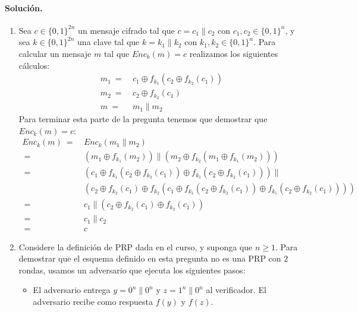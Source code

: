 \paragraph{Solución.}                                                                                                                
\begin{enumerate}                                                                                                                   
  \item Sea $c \in \{0,1\}^{2n}$ un mensaje cifrado tal que $c = c_1 \| c_2$ con $c_1,
c_2 \in \{0,1\}^n$, y sea $k \in \{0,1\}^{2n}$ una clave tal que $k =
k_1 \| k_2$ con $k_1, k_2 \in \{0,1\}^n$. Para calcular un mensaje $m$ tal que $\textit{Enc}_k(m) = c$ realizamos los siguientes cálculos:
\begin{align*}
m_1 \ = \ &c_1 \oplus f_{k_1}(c_2 \oplus f_{k_2}(c_1))\\
m_2 \ = \ &c_2 \oplus f_{k_2}(c_1)\\
m \ = \ &m_1 \| m_2
\end{align*}
Para terminar esta parte de la pregunta tenemos que demostrar que $\textit{Enc}_k(m) = c$:
\begin{align*}
\textit{Enc}_k(m) \ = \ &\textit{Enc}_k(m_1 \| m_2)\\
\ = \ &(m_1 \oplus f_{k_1}(m_2)) \| (m_2 \oplus f_{k_2}(m_1 \oplus f_{k_1}(m_2)))\\
\ = \ &(c_1 \oplus f_{k_1}(c_2 \oplus f_{k_2}(c_1)) \oplus f_{k_1}(c_2 \oplus f_{k_2}(c_1))) \|\\
&(c_2 \oplus f_{k_2}(c_1) \oplus f_{k_2}(c_1 \oplus f_{k_1}(c_2 \oplus f_{k_2}(c_1)) \oplus f_{k_1}(c_2 \oplus f_{k_2}(c_1))))\\
\ = \ & c_1 \| (c_2 \oplus f_{k_2}(c_1) \oplus f_{k_2}(c_1))\\
\ = \ & c_1 \| c_2\\
\ = \ & c
\end{align*}

\item Considere la definición de PRP dada en el curso, y suponga que $n \geq 1$. Para demostrar que el esquema definido en esta pregunta no es una PRP con $2$
rondas, usamos un adversario que ejecuta los siguientes pasos:
\begin{itemize}
  \item El adversario entrega $y = 0^{n} \| 0^n$ y $z = 1^n \| 0^n$ al verificador. El adversario recibe como respuesta $f(y)$ y 
    $f(z)$.


\end{itemize}
\end{enumerate}
